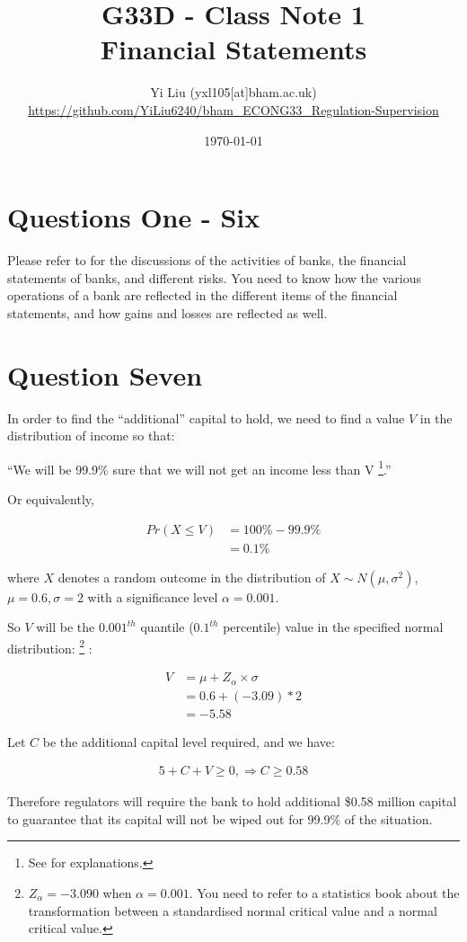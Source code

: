\documentclass[12pt]{article}
\author{Yi Liu (yxl105[at]bham.ac.uk)\\\scriptsize{\url{https://github.com/YiLiu6240/bham_ECONG33_Regulation-Supervision}}}
\date{\today}
\title{G33D - Class Note 1\\Financial Statements}
\begin{document}
\maketitle

\section*{Questions One - Six}

Please refer to \citet[Chap.2]{hull2012risk} for the discussions of the activities of banks, the financial statements of banks, and different risks.
You need to know how the various operations of a bank are reflected in the different items of the financial statements, and how gains and losses are reflected as well.

\section*{Question Seven}

In order to find the ``additional'' capital to hold, we need to find a value \(V\) in the distribution of income so that:

``We will be 99.9\% sure that we will not get an income less than V%
\footnote{See \citet[Chap.9, pp.183-185]{hull2012risk} for explanations.}.''

Or equivalently,

\begin{align*}
  Pr(X \leq V) & = 100\% - 99.9\% \\
               & = 0.1\%
\end{align*}

where \(X\) denotes a random outcome in the distribution of
\(X \sim N(\mu, \sigma^2)\), \(\mu = 0.6, \sigma = 2\)
with a significance level \(\alpha = 0.001\).

So \(V\) will be the \(0.001^{th}\) quantile (\(0.1^{th}\) percentile) value in the specified normal distribution:%
\footnote{
  \(Z_{\alpha} = -3.090\)  when  \(\alpha = 0.001\).
  You need to refer to a statistics book about the transformation between a standardised normal critical value and a normal critical value.}%
:

\begin{align*}
  V & = \mu + Z_{\alpha} \times \sigma \\
    & = 0.6 + (- 3.09)*2 \\
    & = -5.58
\end{align*}

Let \(C\) be the additional capital level required, and we have:

\begin{align*}
  5 + C + V \geq 0, \Rightarrow C \geq 0.58
\end{align*}

Therefore regulators will require the bank to hold additional \$0.58 million capital to guarantee that its capital will not be wiped out for 99.9\% of the situation.



\end{document}
